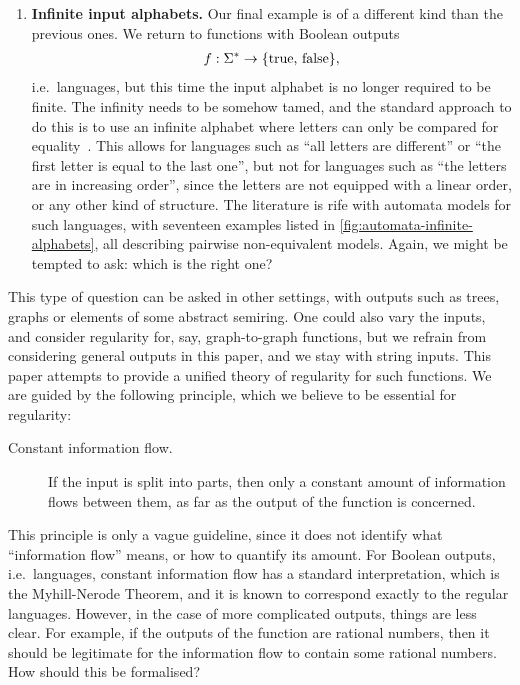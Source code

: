 \begin{enumerate}
\item \textbf{Infinite input alphabets.}
Our final example is of a different kind than the previous ones. We return to functions with Boolean outputs
\begin{align*}
f : \Sigma^* \to \{\text{true, false}\},
\end{align*}
i.e.~languages, but this time the input alphabet is no longer required to be finite. The infinity needs to be somehow tamed, and the standard approach to do this is to use an infinite alphabet where letters can only be compared for equality~\cite{kaminskiFiniteMemoryAutomata1994}. This allows for languages such as ``all letters are different'' or ``the first letter is equal to the last one'', but not for languages such as ``the letters are in increasing order'', since the letters are not equipped with a linear order, or any other kind of structure.
The literature is rife with automata models for such languages, with seventeen examples listed in \cref{fig:automata-infinite-alphabets}, all describing pairwise non-equivalent models. 
 Again, we might be tempted to ask: which  is  the right one?
\end{enumerate}

This type of question can be asked in other settings, with   outputs such as  trees,  graphs or elements of some abstract semiring. One could also vary the inputs, and consider regularity for, say, graph-to-graph functions, but we refrain from considering general outputs in this paper, and we stay with string inputs. This paper attempts to provide a unified theory of regularity for such functions.   We are guided by  the following principle, which we believe to be essential for regularity:
\begin{description}
    \item[Constant information flow.]   If the input is split into parts, then only a constant amount of information  flows between them, as far as the output of the function is concerned.
\end{description}
This principle is only a vague guideline, since it does not identify what
``information flow'' means, or how to quantify its amount. For Boolean outputs,
i.e.~languages, constant information flow has a standard interpretation, which is the
Myhill-Nerode Theorem, and it is known to
correspond exactly to the regular languages. However, in the case of more
complicated outputs, things are less clear.  For example, if the outputs of the
function are rational numbers, then it should be legitimate for the information
flow to contain some rational numbers. How should this be formalised?

